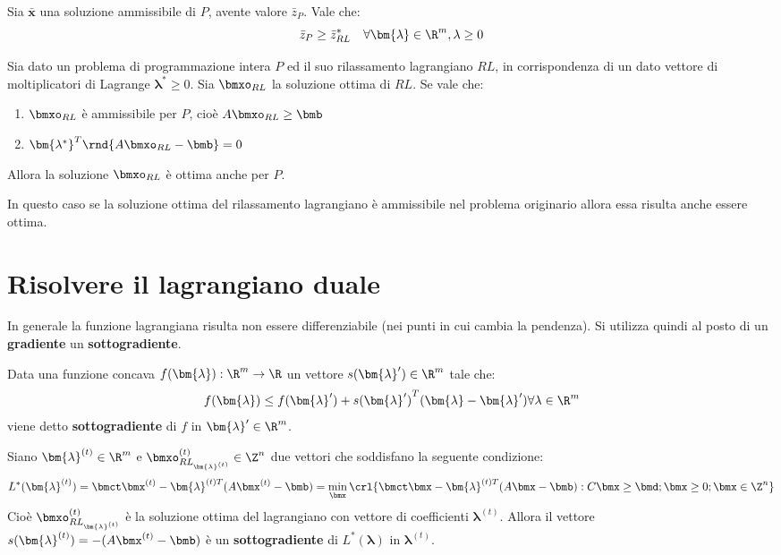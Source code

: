 \documentclass[\main/main.tex]{subfiles}
\begin{document}
\begin{theorem}
    Sia \(\bar{\bm{x}}\) una soluzione ammissibile di \(P\), avente valore \(\bar{z}_P\). Vale che:
    \[
        \bar{z}_P \geq \bar{z}^*_{RL} \quad \forall \bm{\lambda} \in \R^m, \lambda \geq 0
    \]
\end{theorem}

\begin{theorem}
    Sia dato un problema di programmazione intera \(P\) ed il suo rilassamento lagrangiano \(RL\), in corrispondenza di un dato vettore di moltiplicatori di Lagrange \(\bm{\lambda}^*\geq 0\). Sia \(\bmxo_{RL}\) la soluzione ottima di \(RL\). Se vale che:
    \begin{enumerate}
        \item \(\bmxo_{RL}\) è ammissibile per \(P\), cioè \(A\bmxo_{RL} \geq \bmb \)
        \item \({\bm{\lambda^*}}^T \rnd{A\bmxo_{RL}-\bmb}=0\)
    \end{enumerate}
    Allora la soluzione \(\bmxo_{RL}\) è ottima anche per \(P\).
\end{theorem}

\begin{corollary}
    In questo caso se la soluzione ottima del rilassamento lagrangiano è ammissibile nel problema originario allora essa risulta anche essere ottima.
\end{corollary}

\section{Risolvere il lagrangiano duale}
In generale la funzione lagrangiana risulta non essere differenziabile (nei punti in cui cambia la pendenza). Si utilizza quindi al posto di un \textbf{gradiente} un \textbf{sottogradiente}.

\begin{definition}[Sottogradiente]
    Data una funzione concava \(f(\bm{\lambda}): \R^m \rightarrow \R \) un vettore \(s(\bm{\lambda}') \in \R^m\) tale che:
    \[
        f(\bm{\lambda}) \leq f(\bm{\lambda}') + {s(\bm{\lambda}')}^T(\bm{\lambda}-\bm{\lambda}') \forall \lambda \in \R^m
    \]
    viene detto \textbf{sottogradiente} di \(f\) in \(\bm{\lambda}' \in \R^m\).
\end{definition}

\begin{theorem}
    Siano \(\bm{\lambda}^{(t)} \in \R^m\) e \(\bmxo_{RL_{\bm{\lambda}^{(t)}}}^{(t)} \in \Z^n\) due vettori che soddisfano la seguente condizione:
    \[
        L^*(\bm{\lambda}^{(t)})=\bmct\bmx^{(t)} - \bm{\lambda}^{(t)T}(A\bmx^{(t)}-\bmb) = \min_{\bmx}\crl{\bmct\bmx-\bm{\lambda}^{(t)T}(A\bmx-\bmb): C\bmx \geq \bmd; \bmx \geq 0; \bmx \in \Z^n}
    \]
    Cioè \(\bmxo^{(t)}_{RL_{\bm{\lambda}^{(t)}}}\) è la soluzione ottima del lagrangiano con vettore di coefficienti \(\bm{\lambda}^{(t)}\). Allora il vettore \(s(\bm{\lambda}^{(t)}) = - (A\bmx^{(t)}-\bmb)\) è un \textbf{sottogradiente} di \(L^*(\bm{\lambda})\) in \(\bm{\lambda}^{(t)}\).
\end{theorem}
\end{document}
